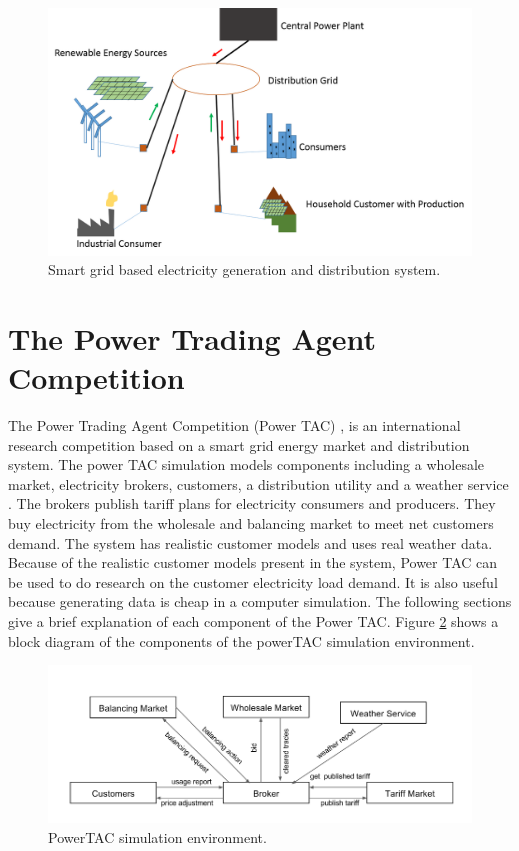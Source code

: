 \begin{figure}[h]
  \includegraphics[width=\linewidth]{smart-grid.png}
  \caption{Smart grid based electricity generation and distribution system.}
  \label{fig:smartgrid}
\end{figure}

\section{The Power Trading Agent Competition}

The Power Trading Agent Competition (Power TAC) \cite{ketter2013power, ketter20162016}, is an international research competition based on a smart grid energy market and distribution system. The power TAC simulation models components including a wholesale market, electricity brokers, customers, a distribution utility and a weather service \cite{ketter20162016}. The brokers publish tariff plans for electricity consumers and producers. They buy electricity from the wholesale and balancing market to meet net customers demand. The system has realistic customer models and uses real weather data. Because of the realistic customer models present in the system, Power TAC can be used to do research on the customer electricity load demand. It is also useful because generating data is cheap in a computer simulation. The following sections give a brief explanation of each component of the Power TAC. Figure \ref{fig:simulation-environment}  shows a block diagram of the components of the powerTAC simulation environment.

\begin{figure}[!h]
  \includegraphics[width=\linewidth]{simulation-environment.png}
  \caption{PowerTAC simulation environment.}
  \label{fig:simulation-environment}
\end{figure}

